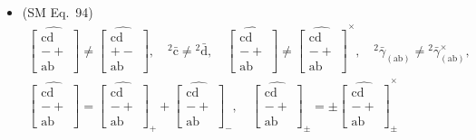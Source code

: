 \documentclass[
    12pt,              %
    a4paper,           %
    headings=normal,   %
    twoside=true,      %
    BCOR=8mm,          %
]{scrbook}
\begin{document}
\begin{itemize}[label={},leftmargin=0pt]
    \item (SM Eq.\ 94) 
    \[
    \begin{gathered}
    \widehat{\left[ \begin{smallmatrix} \mathrm{cd} \\ - + \\ \mathrm{ab} \end{smallmatrix} \right]} \ne \widehat{\left[ \begin{smallmatrix} \mathrm{cd} \\ + - \\ \mathrm{ab} \end{smallmatrix} \right]}, \quad {}^2\bar{\mathrm{c}} \ne {}^2\bar{\mathrm{d}}, \quad \widehat{\left[ \begin{smallmatrix} \mathrm{cd} \\ - + \\ \mathrm{ab} \end{smallmatrix} \right]} \ne \widehat{\left[ \begin{smallmatrix} \mathrm{cd} \\ - + \\ \mathrm{ab} \end{smallmatrix} \right]}^\times, \quad {}^2\bar{\gamma}_{(\mathrm{ab})} \ne {}^2\bar{\gamma}_{(\mathrm{ab})}^\times, \\
    \widehat{\left[ \begin{smallmatrix} \mathrm{cd} \\ - + \\ \mathrm{ab} \end{smallmatrix} \right]} = \widehat{\left[ \begin{smallmatrix} \mathrm{cd} \\ - + \\ \mathrm{ab} \end{smallmatrix} \right]}_+ + \widehat{\left[ \begin{smallmatrix} \mathrm{cd} \\ - + \\ \mathrm{ab} \end{smallmatrix} \right]}_-, \quad \widehat{\left[ \begin{smallmatrix} \mathrm{cd} \\ - + \\ \mathrm{ab} \end{smallmatrix} \right]}_\pm = \pm \widehat{\left[ \begin{smallmatrix} \mathrm{cd} \\ - + \\ \mathrm{ab} \end{smallmatrix} \right]}_\pm^\times
    \end{gathered}
    \]


\end{itemize}
\end{document}

